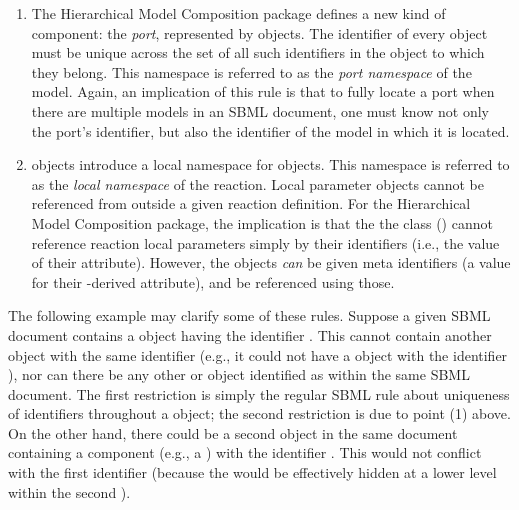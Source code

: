 \begin{enumerate}
\item The Hierarchical Model Composition package defines a new kind of
  component: the \emph{port}, represented by \Port objects.  The
  identifier of every \Port object must be unique across the set of all
  such identifiers in the \Model object to which they belong.  This
  namespace is referred to as the \emph{port namespace} of the model.
  Again, an implication of this rule is that to fully locate a port when
  there are multiple models in an SBML document, one must know not only
  the port's identifier, but also the identifier of the model in which
  it is located.

\item \Reaction objects introduce a local namespace for \LocalParameter
  objects.  This namespace is referred to as the \emph{local namespace}
  of the reaction.  Local parameter objects cannot be referenced from
  outside a given reaction definition.  For the Hierarchical Model
  Composition package, the implication is that the the \SBaseRef class
  () cannot reference reaction local parameters
  simply by their identifiers (i.e., the value of their 
  attribute).  However, the \LocalParameter objects \emph{can} be given
  meta identifiers (a value for their \SBase-derived 
  attribute), and be referenced using those.

% 


\end{enumerate}

The following example may clarify some of these rules.  Suppose a given
SBML document contains a \Model object having the identifier .
This \Model cannot contain another object with the same identifier
(e.g., it could not have a \Parameter object with the identifier
), nor can there be any other \Model or
\ExternalModelDefinition object identified as  within the
same SBML document.  The first restriction is simply the regular SBML
rule about uniqueness of identifiers throughout a \Model object; the
second restriction is due to point (1) above.  On the other hand, there
could be a second \Model object in the same document containing a
component (e.g., a \Parameter) with the identifier .  This
would not conflict with the first \Model identifier (because the
\Parameter would be effectively hidden at a lower level within the
second \Model).

